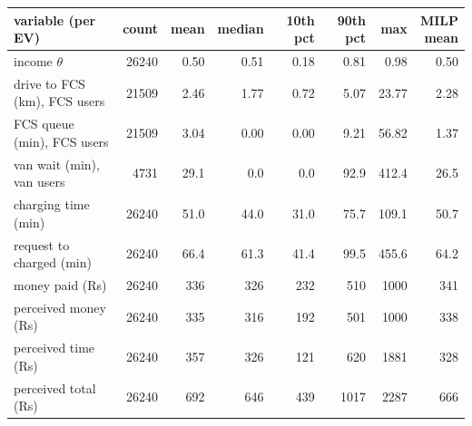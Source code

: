 \begin{tabular}{@{}lrrrrrrr@{}}
\toprule
variable (per EV) & count & mean & median & 10th pct & 90th pct & max & \shortstack[r]{MILP\\mean} \\
\midrule
income $\theta$ & 26240 & 0.50 & 0.51 & 0.18 & 0.81 & 0.98 & 0.50 \\
drive to FCS (km), FCS users & 21509 & 2.46 & 1.77 & 0.72 & 5.07 & 23.77 & 2.28 \\
FCS queue (min), FCS users & 21509 & 3.04 & 0.00 & 0.00 & 9.21 & 56.82 & 1.37 \\
van wait (min), van users & 4731 & 29.1 & 0.0 & 0.0 & 92.9 & 412.4 & 26.5 \\
charging time (min) & 26240 & 51.0 & 44.0 & 31.0 & 75.7 & 109.1 & 50.7 \\
request to charged (min) & 26240 & 66.4 & 61.3 & 41.4 & 99.5 & 455.6 & 64.2 \\
money paid (Rs) & 26240 & 336 & 326 & 232 & 510 & 1000 & 341 \\
perceived money (Rs) & 26240 & 335 & 316 & 192 & 501 & 1000 & 338 \\
perceived time (Rs) & 26240 & 357 & 326 & 121 & 620 & 1881 & 328 \\
perceived total (Rs) & 26240 & 692 & 646 & 439 & 1017 & 2287 & 666 \\
\bottomrule
\end{tabular}
